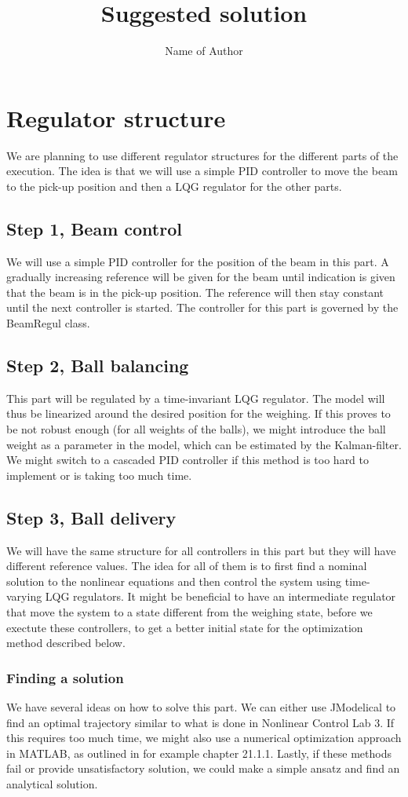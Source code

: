 \documentclass{article}
\title{Suggested solution}
\author{Name of Author}
\begin{document}
\maketitle

\section{Regulator structure}\label{regstruc}
We are planning to use different regulator structures for the different parts of the execution. The idea is that we will use a simple PID controller to move the beam to the pick-up position and then a LQG regulator for the other parts.
\subsection{Step 1, Beam control}
We will use a simple PID controller for the position of the beam in this part. A gradually increasing reference will be given for the beam until indication is given that the beam is in the pick-up position. The reference will then stay constant until the next controller is started. The controller for this part is governed by the BeamRegul class.
\subsection{Step 2, Ball balancing}\label{step2}
This part will be regulated by a time-invariant LQG regulator. The model will thus be linearized around the desired position for the weighing. If this proves to be not robust enough (for all weights of the balls), we might introduce the ball weight as a parameter in the model, which can be estimated by the Kalman-filter. We might switch to a cascaded PID controller if this method is too hard to implement or is taking too much time.
\subsection{Step 3, Ball delivery}
We will have the same structure for all controllers in this part but they will have different reference values. The idea for all of them is to first find a nominal solution to the nonlinear equations and then control the system using time-varying LQG regulators. It might be beneficial to have an intermediate regulator that move the system to a state different from the weighing state, before we exectute these controllers, to get a better initial state for the optimization method described below.
\subsubsection{Finding a solution}
We have several ideas on how to solve this part. We can either use JModelical to find an optimal trajectory similar to what is done in Nonlinear Control Lab 3. If this requires too much time, we might also use a numerical optimization approach in MATLAB, as outlined in for example \cite{NR} chapter 21.1.1. Lastly, if these methods fail or provide unsatisfactory solution, we could make a simple ansatz and find an analytical solution.
\end{document}
